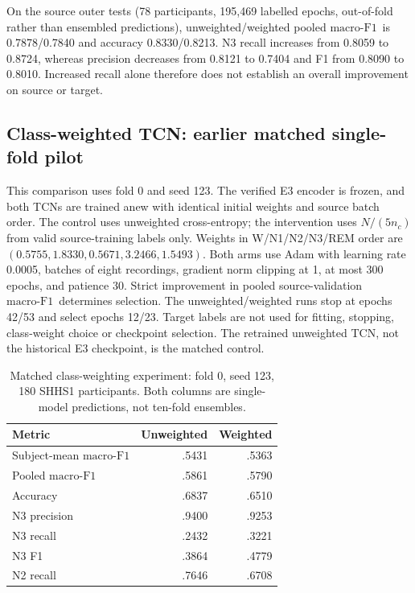 \documentclass[10pt,a4paper]{article}
\newcommand{\mf}{\ensuremath{\mathrm{macro\text{-}F1}}}
\begin{document}
On the source outer tests (78 participants, 195,469 labelled epochs, out-of-fold rather than
ensembled predictions), unweighted/weighted pooled \mf\ is 0.7878/0.7840 and accuracy
0.8330/0.8213. N3 recall increases from 0.8059 to 0.8724, whereas precision decreases from
0.8121 to 0.7404 and F1 from 0.8090 to 0.8010. Increased recall alone therefore does not
establish an overall improvement on source or target.

\subsection*{Class-weighted TCN: earlier matched single-fold pilot}

This comparison uses fold 0 and seed 123. The verified E3 encoder is frozen, and both TCNs are
trained anew with identical initial weights and source batch order. The control uses unweighted
cross-entropy; the intervention uses $N/(5n_c)$ from valid source-training labels only. Weights in
W/N1/N2/N3/REM order are $(0.5755,1.8330,0.5671,3.2466,1.5493)$. Both arms use Adam with learning
rate 0.0005, batches of eight recordings, gradient norm clipping at 1, at most 300 epochs, and
patience 30. Strict improvement in pooled source-validation \mf\ determines selection. The
unweighted/weighted runs stop at epochs 42/53 and select epochs 12/23. Target labels are not used
for fitting, stopping, class-weight choice or checkpoint selection. The retrained unweighted TCN,
not the historical E3 checkpoint, is the matched control.

\begin{table}[H]
\centering\small
\caption{Matched class-weighting experiment: fold 0, seed 123, 180 SHHS1 participants.
Both columns are single-model predictions, not ten-fold ensembles.}
\label{tab:sup_weighted_pilot}
\begin{tabular}{lrr}
\toprule
Metric & Unweighted & Weighted \\
\midrule
Subject-mean \mf & .5431 & .5363 \\
Pooled \mf & .5861 & .5790 \\
Accuracy & .6837 & .6510 \\
N3 precision & .9400 & .9253 \\
N3 recall & .2432 & .3221 \\
N3 F1 & .3864 & .4779 \\
N2 recall & .7646 & .6708 \\
\bottomrule
\end{tabular}
\end{table}
\end{document}
